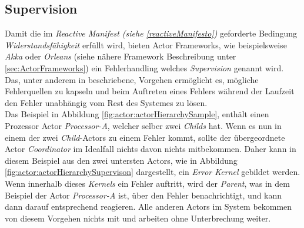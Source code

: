 \subsection{Supervision}\label{actor:supervision}
Damit die im \textit{Reactive Manifest (siehe \ref{reactiveManifesto})} geforderte Bedingung \textit{Widerstandsfähigkeit} erfüllt wird, bieten Actor Frameworks, wie beispielsweise \textit{Akka} oder \textit{Orleans} (siehe nähere Framework Beschreibung unter \ref{sec:ActorFrameworks}) ein Fehlerhandling welches \textit{Supervision} genannt wird. Das, unter anderem in \cite{sargent2016play} beschriebene, Vorgehen ermöglicht es, mögliche Fehlerquellen zu kapseln und beim Auftreten eines Fehlers während der Laufzeit den Fehler unabhängig vom Rest des Systemes zu lösen.\\
Das Beispiel in Abbildung \ref{fig:actor:actorHierarchySample}, enthält  einen Prozessor Actor \textit{Processor-A}, welcher selber zwei \textit{Childs} hat. Wenn es nun in einem der zwei \textit{Child}-Actors zu einem Fehler kommt, sollte der übergeordnete Actor \textit{Coordinator} im Idealfall nichts davon nichts mitbekommen. Daher kann in diesem Beispiel aus den zwei untersten Actors, wie in Abbildung \ref{fig:actor:actorHierarchySupervison} dargestellt, ein \textit{Error Kernel} gebildet werden. Wenn innerhalb dieses \textit{Kernels} ein Fehler auftritt, wird der \textit{Parent}, was in dem Beispiel der Actor \textit{Processor-A} ist, über den Fehler benachrichtigt, und kann dann darauf entsprechend reagieren. Alle anderen Actors im System bekommen von diesem Vorgehen nichts mit und arbeiten ohne Unterbrechung weiter. \\
